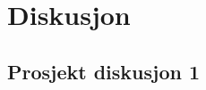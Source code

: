\section{Diskusjon}\label{sec:Diskusjon}

\subsection{Prosjekt diskusjon 1}\label{sec:prosekt diskusjon}
